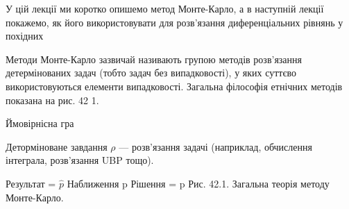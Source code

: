\documentclass[
  ukrainian,
]{article}
\begin{document}
У цій лекції ми коротко опишемо метод Монте-Карло, а в наступній лекції
покажемо, як його використовувати для розв'язання диференціальних
рівнянь у похідних

Методи Монте-Карло зазвичай називають групою методів розв'язання
детермінованих задач (тобто задач без випадковості), у яких суттєво
використовуються елементи випадковості. Загальна філософія етнічних
методів показана на рис. 42 1.

Ймовірнісна гра

Деторміноване завдання \(\rho\) --- розв'язання задачі (наприклад,
обчислення інтеграла, розв'язання UBP тощо).

Результат = \(\hat{p}\) Наближення p Рішення = p Рис. 42.1. Загальна
теорія методу Монте-Карло.
\end{document}
